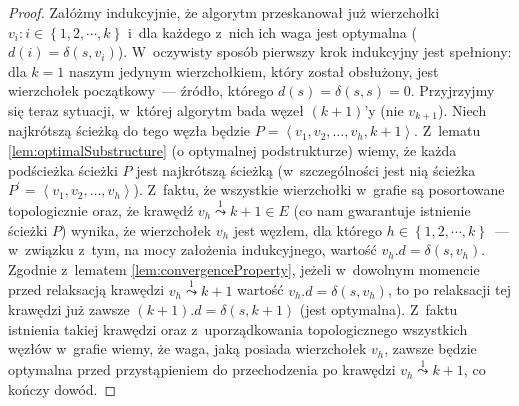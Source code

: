 \begin{proof}
Załóżmy indukcyjnie, że algorytm przeskanował już wierzchołki $v_{i} : i \in \left\{ 1, 2, \cdots, k \right\}$ i~dla każdego z~nich ich waga jest optymalna ($d \left( i \right) = \delta \left( s, v_{i} \right)$). W~oczywisty sposób pierwszy krok indukcyjny jest spełniony: dla $k = 1$ naszym jedynym wierzchołkiem, który został obsłużony, jest wierzchołek początkowy~--- źródło, którego $d \left( s \right) = \delta \left( s, s \right) = 0$. Przyjrzyjmy się teraz sytuacji, w~której algorytm bada węzeł $\left(k+1\right)$'y (nie $v_{k+1}$). Niech najkrótszą ścieżką do tego węzła będzie $P = \left \langle v_{1}, v_{2}, \ldots, v_{h}, k+1 \right \rangle $. Z~lematu \ref{lem:optimalSubstructure} (o optymalnej podstrukturze) wiemy, że każda podścieżka ścieżki $P$ jest najkrótszą ścieżką (w~szczególności jest nią ścieżka $P^{'} = \left \langle v_{1}, v_{2}, \ldots, v_{h} \right \rangle $). Z~faktu, że wszystkie wierzchołki w~grafie są posortowane topologicznie oraz, że krawędź $v_{h} \overset{1}\leadsto k+1 \in E$ (co nam gwarantuje istnienie ścieżki $P$) wynika, że wierzchołek $v_{h}$ jest węzłem, dla którego $h \in \left\{ 1, 2, \cdots, k \right\}$~--- w~związku z~tym, na mocy założenia indukcyjnego, wartość $v_{h}.d = \delta \left( s, v_{h} \right)$. Zgodnie z~lematem \ref{lem:convergenceProperty}, jeżeli w~dowolnym momencie przed relaksacją krawędzi $v_{h} \overset{1}\leadsto k+1$ wartość $v_{h}.d = \delta \left( s, v_{h} \right)$, to po relaksacji tej krawędzi już zawsze $ \left( k+1 \right).d = \delta \left( s, k+1 \right) $ (jest optymalna). Z~faktu istnienia takiej krawędzi oraz z~uporządkowania topologicznego wszystkich węzłów w~grafie wiemy, że waga, jaką posiada wierzchołek $v_{h}$, zawsze będzie optymalna przed przystąpieniem do przechodzenia po krawędzi $v_{h} \overset{1}\leadsto k+1$, co kończy dowód.
\end{proof}


